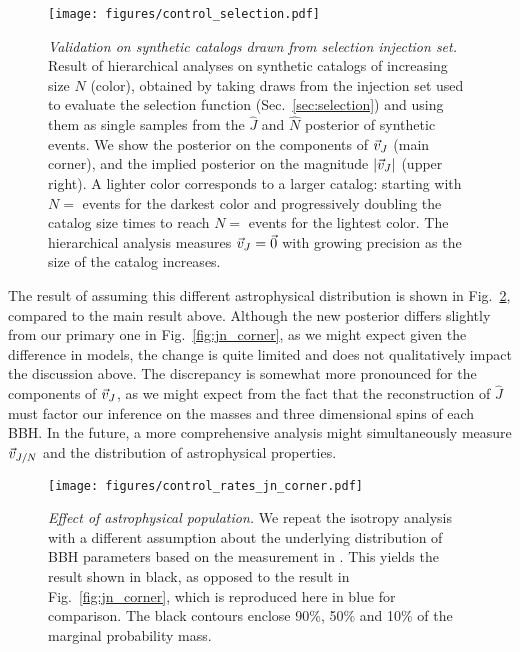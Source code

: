 \documentclass[twocolumn,twocolappendix,linenumbers]{aastex631}
\newcommand{\Nitersel}{}
\newcommand{\Nstartsel}{}
\newcommand{\Nmaxsel}{}
\begin{document}
\begin{figure}
\texttt{[image: figures/control\_selection.pdf]}
\caption{\emph{Validation on synthetic catalogs drawn from selection injection set.}
Result of hierarchical analyses on synthetic catalogs of increasing size $N$ (color), obtained by taking draws from the injection set used to evaluate the selection function (Sec.~\ref{sec:selection}) and using them as single samples from the $\hat{J}$ and $\hat{N}$ posterior of synthetic events.
We show the posterior on the components of $\vec{v}_{J}$ (main corner), and the implied posterior on the magnitude $|\vec{v}_{J}|$ (upper right).
A lighter color corresponds to a larger catalog: starting with $N = \Nstartsel$ events for the darkest color and progressively doubling the catalog size \Nitersel times to reach $N = \Nmaxsel$ events for the lightest color.
The hierarchical analysis measures $\vec{v}_{J} = \vec{0}$ with growing precision as the size of the catalog increases.
}
\label{fig:control-sel}
\end{figure}

The result of assuming this different astrophysical distribution is shown in Fig.~\ref{fig:control-spins}, compared to the main result above.
Although the new posterior differs slightly from our primary one in Fig.~\ref{fig:jn_corner}, as we might expect given the difference in models, the change is quite limited and does not qualitatively impact the discussion above.
The discrepancy is somewhat more pronounced for the components of $\vec{v}_{J}$, as we might expect from the fact that the reconstruction of $\hat{J}$ must factor our inference on the masses and three dimensional spins of each \ac{BBH}.
In the future, a more comprehensive analysis might simultaneously measure $\vec{v}_{J/N}$ and the distribution of astrophysical properties.

\begin{figure}
\texttt{[image: figures/control\_rates\_jn\_corner.pdf]}
\caption{\emph{Effect of astrophysical population.} We repeat the isotropy analysis with a different assumption about the underlying distribution of \ac{BBH} parameters based on the measurement in \citet{LIGOScientific:2021psn}.
This yields the result shown in black, as opposed to the result in Fig.~\ref{fig:jn_corner}, which is reproduced here in blue for comparison.
The black contours enclose 90\%, 50\% and 10\% of the marginal probability mass.
}
\label{fig:control-spins}
\end{figure}
\end{document}
